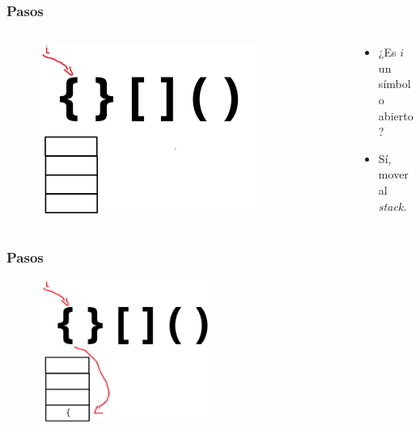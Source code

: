 \documentclass[17pt, t, lualatex]{beamer}
\begin{document}
\begin{frame}
  \frametitle{Pasos}

  \begin{columns}
    \begin{column}{.5\textwidth}
  \begin{figure}[h]
    \centering
    \includegraphics[width=0.8\textwidth]{img/Problema1-2.png}
  \end{figure}
    \end{column}

    \begin{column}{.5\textwidth}
      \begin{itemize}
        \item ¿Es $i$ un símbolo abierto?
        \item Sí, mover al \textit{stack}.
      \end{itemize}
    \end{column}
  \end{columns}

\end{frame}

\begin{frame}
  \frametitle{Pasos}
  \begin{figure}[h]
    \centering
    \includegraphics[width=0.5\textwidth]{img/Problema1-3.png}
  \end{figure}
\end{frame}
\end{document}
